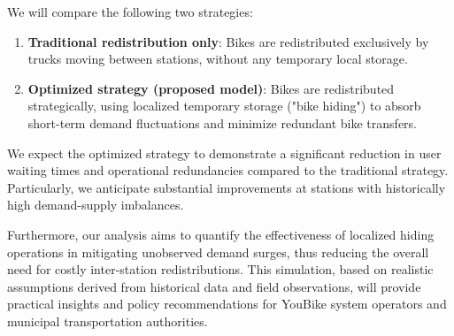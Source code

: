 \documentclass[11pt,a4paper]{article}
\begin{document}
We will compare the following two strategies:

\begin{enumerate}
    \item \textbf{Traditional redistribution only}: Bikes are redistributed exclusively by trucks moving between stations, without any temporary local storage.
    \item \textbf{Optimized strategy (proposed model)}: Bikes are redistributed strategically, using localized temporary storage ("bike hiding") to absorb short-term demand fluctuations and minimize redundant bike transfers.
\end{enumerate}

We expect the optimized strategy to demonstrate a significant reduction in user waiting times and operational redundancies compared to the traditional strategy. Particularly, we anticipate substantial improvements at stations with historically high demand-supply imbalances. 

Furthermore, our analysis aims to quantify the effectiveness of localized hiding operations in mitigating unobserved demand surges, thus reducing the overall need for costly inter-station redistributions. This simulation, based on realistic assumptions derived from historical data and field observations, will provide practical insights and policy recommendations for YouBike system operators and municipal transportation authorities.
\vspace{0.5em}
\end{document}
